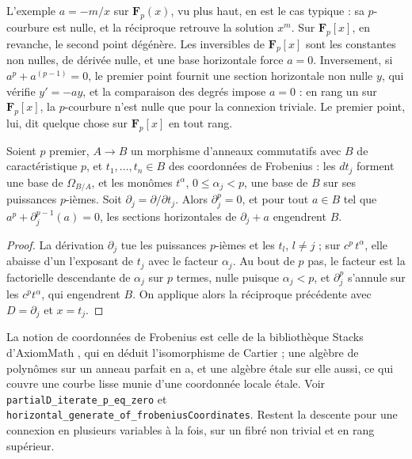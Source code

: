 L'exemple $a = -m/x$ sur $\mathbf F_p(x)$, vu plus haut, en est le cas typique : sa $p$-courbure est nulle, et la réciproque retrouve la solution $x^m$. Sur $\mathbf F_p[x]$, en revanche, le second point dégénère. Les inversibles de $\mathbf F_p[x]$ sont les constantes non nulles, de dérivée nulle, et une base horizontale force $a = 0$. Inversement, si $a^p + a^{(p-1)} = 0$, le premier point fournit une section horizontale non nulle $y$, qui vérifie $y' = -ay$, et la comparaison des degrés impose $a = 0$ : en rang un sur $\mathbf F_p[x]$, la $p$-courbure n'est nulle que pour la connexion triviale. Le premier point, lui, dit quelque chose sur $\mathbf F_p[x]$ en tout rang.

\begin{enonce}
Soient $p$ premier, $A \to B$ un morphisme d'anneaux commutatifs avec $B$ de caractéristique $p$, et $t_1, \ldots, t_n \in B$ des coordonnées de Frobenius : les $dt_j$ forment une base de $\Omega_{B/A}$, et les monômes $t^\alpha$, $0 \leqslant \alpha_j < p$, une base de $B$ sur ses puissances $p$-ièmes. Soit $\partial_j = \partial/\partial t_j$. Alors $\partial_j^p = 0$, et pour tout $a \in B$ tel que $a^p + \partial_j^{p-1}(a) = 0$, les sections horizontales de $\partial_j + a$ engendrent $B$.
\end{enonce}

\begin{proof}
La dérivation $\partial_j$ tue les puissances $p$-ièmes et les $t_l$, $l \neq j$ ; sur $c^p\, t^\alpha$, elle abaisse d'un l'exposant de $t_j$ avec le facteur $\alpha_j$. Au bout de $p$ pas, le facteur est la factorielle descendante de $\alpha_j$ sur $p$ termes, nulle puisque $\alpha_j < p$, et $\partial_j^p$ s'annule sur les $c^p t^\alpha$, qui engendrent $B$. On applique alors la réciproque précédente avec $D = \partial_j$ et $x = t_j$.
\end{proof}

\noindent La notion de coordonnées de Frobenius est celle de la bibliothèque Stacks d'AxiomMath \cite{axiomstacks}, qui en déduit l'isomorphisme de Cartier ; une algèbre de polynômes sur un anneau parfait en a, et une algèbre étale sur elle aussi, ce qui couvre une courbe lisse munie d'une coordonnée locale étale. Voir \texttt{partialD\_iterate\_p\_eq\_zero} et \texttt{horizontal\_generate\_of\_frobeniusCoordinates}. Restent la descente pour une connexion en plusieurs variables à la fois, sur un fibré non trivial et en rang supérieur.

